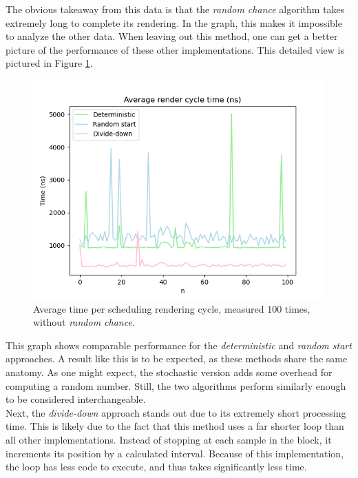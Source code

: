 \documentclass[10pt, twocolumn]{IEEEtran}
\begin{document}
The obvious takeaway from this data is that the \textit{random chance} algorithm takes extremely long to complete its rendering. In the graph, this makes it impossible to analyze the other data. When leaving out this method, one can get a better picture of the performance of these other implementations. This detailed view is pictured in Figure \ref{fig:scd_cycle_time_detail}.\pagebreak
\begin{figure}[ht!]
	\includegraphics[width=\linewidth]{scd_cycle_time_detail.png}
	\caption{Average time per scheduling rendering cycle, measured 100 times, without \textit{random chance}.}
	\label{fig:scd_cycle_time_detail}
\end{figure}

This graph shows comparable performance for the \textit{deterministic} and \textit{random start} approaches. A result like this is to be expected, as these methods share the same anatomy. As one might expect, the stochastic version adds some overhead for computing a random number. Still, the two algorithms perform similarly enough to be considered interchangeable.\\
Next, the \textit{divide-down} approach stands out due to its extremely short processing time. This is likely due to the fact that this method uses a far shorter loop than all other implementations. Instead of stopping at each sample in the block, it increments its position by a calculated interval. Because of this implementation, the loop has less code to execute, and thus takes significantly less time.
\end{document}
